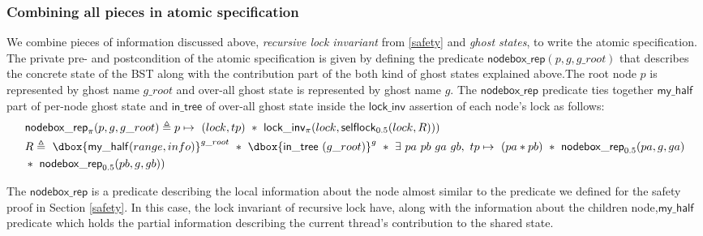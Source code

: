 \documentclass[acmsmall,screen]{acmart}\settopmatter{printfolios=true}
\newcommand\dboxed[1]{\dbox{\ensuremath{#1}}}
\newcommand{\ghost}[2]{\ensuremath{\dboxed{#1}^{#2}}}
\begin{document}
\subsubsection{Combining all pieces in atomic specification}
We combine pieces of information discussed above, \emph{recursive lock invariant} from \ref{safety} and \emph{ghost states}, to write the atomic specification. The private pre- and postcondition of the atomic specification is given by defining the predicate $\mathsf{nodebox\_rep}(p,g,g\_root)$ that describes the concrete state of the BST along with the contribution part of the both kind of ghost states explained above.The root node $p$ is represented by ghost name $g\_root$ and over-all ghost state is represented by ghost name $g$. The $\mathsf{nodebox\_rep}$ predicate ties together $\mathsf{my\_half}$ part of per-node ghost state and $\mathsf{in\_tree}$ of over-all ghost state inside the $\mathsf{lock\_inv}$ assertion of each node's lock as follows:
\begin{align*}
    &\mathsf{nodebox\_rep}_{\pi}(p,g,g\_root) \triangleq  p\mapsto\ (lock,tp)\ *\ \mathsf{lock\_inv_{\pi}}(lock, \mathsf{selflock}_{0.5}(lock,R))) \\&R  \triangleq\ \ghost{\mathsf{my\_half}(range,info)}{g\_root}\ *\ \ghost{\mathsf{in\_tree}\ (g\_root)}{g}\ *\ \exists\ pa\ pb\ ga\ gb,\ tp\mapsto\ (pa * pb)\ *\  \mathsf{nodebox\_rep}_{0.5}(pa,g,ga) \\& *\ \mathsf{nodebox\_rep}_{0.5}(pb,g,gb))\end{align*}
    
The $\mathsf{nodebox\_rep}$ is a predicate describing the local information about the node almost similar to the predicate we defined for the safety proof in Section \ref{safety}. In this case, the lock invariant of recursive lock have, along with the information about the children node,$\mathsf{my\_half}$ predicate which holds the partial information describing the current thread's contribution to the shared state.
\end{document}
